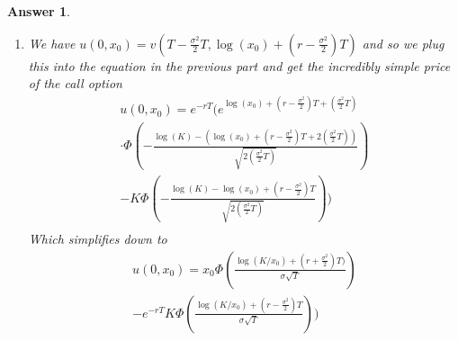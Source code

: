 \documentclass[12pt]{article}
\theoremstyle{colon}
\newtheorem*{answer}{Answer}
\begin{document}
\begin{answer}
\begin{enumerate}[label=\alph*)]
    \item We have $u(0, x_0) = v(T - \frac{\sigma^2}{2}T, \log(x_0) + (r - \frac{\sigma^2}{2})T)$ and so we plug this into the equation in the previous part and get the incredibly simple price of the call option
      \begin{gather*}
        u(0, x_0) = e^{-rT} \Bigg( e^{\log(x_0) + (r - \frac{\sigma^2}{2})T + (\frac{\sigma^2}{2}T)} \\
        \cdot \Phi \left(-\frac{\log (K) - (\log(x_0) + (r - \frac{\sigma^2}{2})T+ 2(\frac{\sigma^2}{2}T))}{\sqrt{2(\frac{\sigma^2}{2}T)}} \right) \\
        - K \Phi \left(-\frac{\log (K) - \log(x_0) + (r - \frac{\sigma^2}{2})T}{\sqrt{2(\frac{\sigma^2}{2}T)}} \right) \Bigg) \\
      \end{gather*}
      Which simplifies down to
      \begin{gather*}
        u(0, x_0) = x_0 \Phi \left(\frac{\log (K/x_0)  + (r + \frac{\sigma^2}{2})T)}{\sigma \sqrt{T}} \right) \\
        - e^{-rT} K \Phi \left(\frac{\log (K/x_0) + (r - \frac{\sigma^2}{2})T}{\sigma \sqrt{T}} \right) \Bigg)
      \end{gather*}
  \end{enumerate}
\end{answer}
\end{document}
